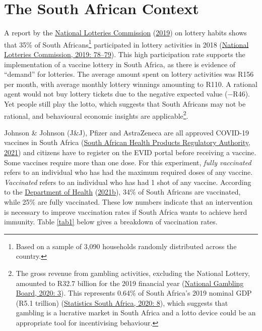 \documentclass[11pt,preprint, authoryear]{elsarticle}
\numberwithin{equation}{section}
\numberwithin{figure}{section}
\numberwithin{table}{section}
\let\rmarkdownfootnote\footnote%
\def\footnote{\protect\rmarkdownfootnote}
\begin{document}
\hypertarget{the-south-african-context}{%
\section{\texorpdfstring{The South African Context
\label{context}}{The South African Context }}\label{the-south-african-context}}

A report by the \protect\hyperlink{ref-lotto}{National Lotteries
Commission} (\protect\hyperlink{ref-lotto}{2019}) on lottery habits
shows that 35\% of South Africans\footnote{Based on a sample of 3,090
  households randomly distributed across the country.} participated in
lottery activities in 2018 (\protect\hyperlink{ref-lotto}{National
Lotteries Commission, 2019: 78--79}). This high participation rate
supports the implementation of a vaccine lottery in South Africa, as
there is evidence of ``demand'' for lotteries. The average amount spent
on lottery activities was R156 per month, with average monthly lottery
winnings amounting to R110. A rational agent would not buy lottery
tickets due to the negative expected value (\(-\)R46). Yet people still
play the lotto, which suggests that South Africans may not be rational,
and behavioural economic insights are applicable\footnote{The gross
  revenue from gambling activities, excluding the National Lottery,
  amounted to R32.7 billion for the 2019 financial year
  (\protect\hyperlink{ref-gamble}{National Gambling Board, 2020: 3}).
  This represents 0.64\% of South Africa's 2019 nominal GDP (R5.1
  trillion) (\protect\hyperlink{ref-statsa}{Statistics South Africa,
  2020: 8}), which suggests that gambling is a lucrative market in South
  Africa and a lotto device could be an appropriate tool for
  incentivising behaviour.}.

Johnson \& Johnson (J\&J), Pfizer and AstraZeneca are all approved
COVID-19 vaccines in South Africa (\protect\hyperlink{ref-sah}{South
African Health Products Regulatory Authority, 2021}) and citizens have
to register on the EVID portal before receiving a vaccine. Some vaccines
require more than one dose. For this experiment, \emph{fully vaccinated}
refers to an individual who has had the maximum required doses of any
vaccine. \emph{Vaccinated} refers to an individual who has had 1 shot of
any vaccine. According to the \protect\hyperlink{ref-stat}{Department of
Health} (\protect\hyperlink{ref-stat}{2021b}), 34\% of South Africans
are vaccinated, while 25\% are fully vaccinated. These low numbers
indicate that an intervention is necessary to improve vaccination rates
if South Africa wants to achieve herd immunity. Table \ref{tab1} below
gives a breakdown of vaccination rates.
\end{document}
